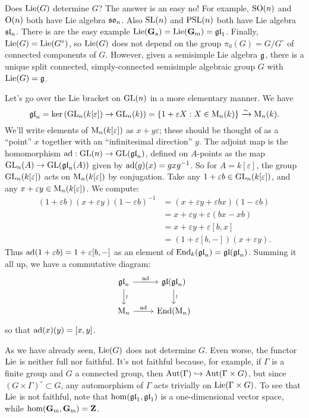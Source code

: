 Does $\operatorname{Lie}(G)$ determine $G$? The answer is an easy no! For example, 
$\operatorname{SO}(n)$ and $\operatorname{O}(n)$ both have Lie algebra $\mathfrak{so}_n$. Also 
$\operatorname{SL}(n)$ and $\operatorname{PSL}(n)$ both have Lie algebra $\mathfrak{sl}_n$. There is are the 
easy example $\operatorname{Lie}(\mathbf{G}_\mathrm{a})=\operatorname{Lie}(\mathbf{G}_\mathrm{m})=\mathfrak{gl}_1$. Finally, 
$\operatorname{Lie}(G)=\operatorname{Lie}(G^\circ)$, so $\operatorname{Lie}(G)$ does not depend on the group 
$\pi_0(G)=G/G^\circ$ of connected components of $G$. However, given a 
semisimple Lie algebra $\mathfrak{g}$, there is a unique split connected, 
simply-connected semisimple algebraic group $G$ with $\operatorname{Lie}(G)=\mathfrak{g}$. 

\begin{example}
Let's go over the Lie bracket on $\operatorname{GL}(n)$ in a more elementary manner. We have 
\[
  \mathfrak{gl}_n = \ker\left(\operatorname{GL}_n(k[\varepsilon])\to\operatorname{GL}_n(k)\right) = \{1+\varepsilon X:X\in \operatorname{M}_n(k)\} \xrightarrow\sim \operatorname{M}_n(k) .
\]
We'll write elements of $\operatorname{M}_n(k[\varepsilon])$ as $x+y\varepsilon$; 
these should be thought of as a ``point'' $x$ together with an ``infinitesimal 
direction'' $y$. The adjoint map is the homomorphism 
$\operatorname{ad}:\operatorname{GL}(n)\to \operatorname{GL}(\mathfrak{gl}_n)$, defined on $A$-points as the map 
$\operatorname{GL}_n(A)\to \operatorname{GL}(\mathfrak{gl}_n(A))$ given by $\operatorname{ad}(g)(x) = g x g^{-1}$. So for 
$A=k[\varepsilon]$, the group $\operatorname{GL}_n(k[\varepsilon])$ acts on 
$\operatorname{M}_n(k[\varepsilon])$ by conjugation. Take any 
$1+\varepsilon b\in \operatorname{GL}_n(k[\varepsilon])$, and any 
$x+\varepsilon y\in \operatorname{M}_n(k[\varepsilon])$. We compute: 
\begin{align*}
  (1+\varepsilon b)(x+\varepsilon y)(1-\varepsilon b)^{-1} 
    &= (x+\varepsilon y+\varepsilon b x)(1-\varepsilon b) \\
    &= x+\varepsilon y + \varepsilon(b x-x b) \\
    &= x+\varepsilon y + \varepsilon [b,x] \\
    &= (1+\varepsilon[b,-])(x+\varepsilon y) .
\end{align*}
Thus $\operatorname{ad}(1+\varepsilon b)=1+\varepsilon [b,-]$ as an element of 
$\operatorname{End}_k(\mathfrak{gl}_n) = \mathfrak{gl}(\mathfrak{gl}_n)$. Summing it all up, we have a commutative 
diagram: 
\[\begin{tikzcd}
  \gl_n \ar[r, "\adjoint"] \ar[d, "\wr"]
    & \gl(\gl_n) \ar[d, "\wr"] \\
  \matrices_n \ar[r, "\adjoint"] 
    & \End(\matrices_n)
\end{tikzcd}\]
so that $\operatorname{ad}(x)(y) = [x,y]$. 
\end{example}

As we have already seen, $\operatorname{Lie}(G)$ does not determine $G$. Even worse, the 
functor $\operatorname{Lie}$ is neither full nor faithful. It's not faithful because, for 
example, if $\Gamma$ is a finite group and $G$ a connected group, then 
$\operatorname{Aut}(\Gamma)\hookrightarrow \operatorname{Aut}(\Gamma\times G)$, but 
since $(G\times\Gamma)^\circ\subset G$, any automorphism of $\Gamma$ acts 
trivially on $\operatorname{Lie}(\Gamma\times G)$. To see that $\operatorname{Lie}$ is not faithful, 
note that $\hom(\mathfrak{gl}_1,\mathfrak{gl}_1)$ is a one-dimensional vector space, while 
$\hom(\mathbf{G}_\mathrm{m},\mathbf{G}_\mathrm{m})=\mathbf{Z}$. 

